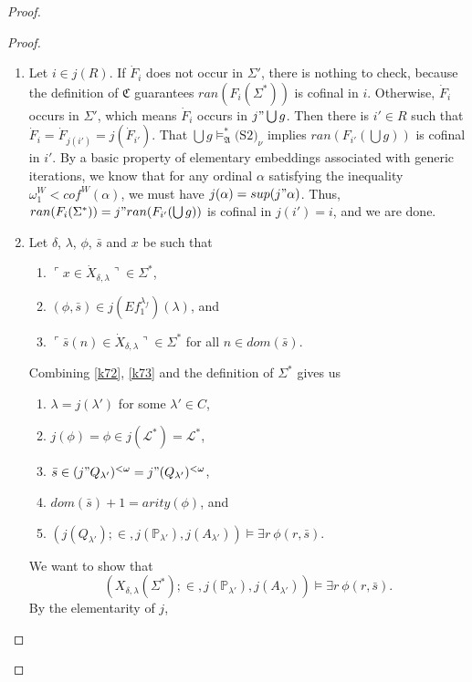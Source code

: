\documentclass[12pt, twoside]{memoir}
\numberwithin{equation}{section}
\theoremstyle{definition}
\theoremstyle{remark}
\theoremstyle{definition}
\theoremstyle{definition}
\theoremstyle{definition}
\theoremstyle{remark}
\newcommand{\eq}{=}
\begin{document}
\begin{proof}
\begin{proof}
\begin{enumerate}[label=<$k$> $\eq$ \arabic* :, leftmargin=70pt]
    \addtocounter{enumi}{1}
    \item Let $i \in j(R)$. If $\dot{F}_i$ does not occur in $\Sigma'$, there is nothing to check, because the definition of $\mathfrak{C}$ guarantees $ran(F_i(\Sigma^*))$ is cofinal in $i$. Otherwise, $\dot{F}_i$ occurs in $\Sigma'$, which means $\dot{F}_i$ occurs in $j" \bigcup g$. Then there is $i' \in R$ such that $\dot{F}_i = \dot{F}_{j(i')} = j(\dot{F}_{i'})$. That $\bigcup g \models^*_{\mathfrak{A}} \hyperref[c2]{\text{(S2)}_{\nu}}$ implies $ran(F_{i'}(\bigcup g))$ is cofinal in $i'$. By a basic property of elementary embeddings associated with generic iterations, we know that for any ordinal $\alpha$ satisfying the inequality $\omega_1^W < cof^{W}(\alpha)$, we must have $j(\alpha) = sup(j" \alpha)$. Thus, $ran(F_i(\Sigma^*)) = j" ran(F_{i'}(\bigcup g))$ is cofinal in $j(i') = i$, and we are done.
    \addtocounter{enumi}{4}
    \item\label{k7m} Let $\delta$, $\lambda$, $\phi$, $\bar{s}$ and $x$ be such that 
    \begin{enumerate}[label=(K7.\arabic*), leftmargin=50pt]
        \item $\ulcorner x \in \dot{X}_{\delta, \lambda} \urcorner \in \Sigma^*$,
        \item\label{k72} $(\phi, \bar{s}) \in j(Ef_1^{\lambda_f})(\lambda)$, and
        \item\label{k73} $\ulcorner \bar{s}(n) \in \dot{X}_{\delta, \lambda} \urcorner \in \Sigma^*$ for all $n \in dom(\bar{s})$.
    \end{enumerate}
    Combining \ref{k72}, \ref{k73} and the definition of $\Sigma^*$ gives us 
    \begin{enumerate}[label=(\alph*)]
        \item $\lambda = j(\lambda')$ for some $\lambda' \in C$,
        \item $j(\phi) = \phi \in j(\mathcal{L}^*) = \mathcal{L}^*$,
        \item $\bar{s} \in (j" Q_{\lambda'})^{< \omega} = j" (Q_{\lambda'})^{< \omega}$,
        \item $dom(\bar{s}) + 1 = arity(\phi)$, and
        \item $(j(Q_{\lambda'}); \in, j(\mathbb{P}_{\lambda'}), j(A_{\lambda'})) \models \exists r \ \phi(r, \bar{s})$.
    \end{enumerate}
    We want to show that $$(X_{\delta, \lambda}(\Sigma^*); \in, j(\mathbb{P}_{\lambda'}), j(A_{\lambda'})) \models \exists r \ \phi(r, \bar{s}).$$ By the elementarity of $j$, 

\end{enumerate}
\end{proof}
\end{proof}
\end{document}
